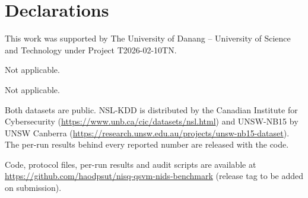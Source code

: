 
\section*{Declarations}

This work was supported by The University of Danang -- University of Science
and Technology under Project T2026-02-10TN.


Not applicable.

Not applicable.

Both datasets are public. NSL-KDD is distributed by the Canadian Institute for Cybersecurity
(\url{https://www.unb.ca/cic/datasets/nsl.html}) and UNSW-NB15 by UNSW Canberra
(\url{https://research.unsw.edu.au/projects/unsw-nb15-dataset}). The per-run results behind
every reported number are released with the code.

Code, protocol files, per-run results and audit scripts are available at
\url{https://github.com/haodpsut/nisq-qsvm-nids-benchmark} (release tag to be added on
submission).

